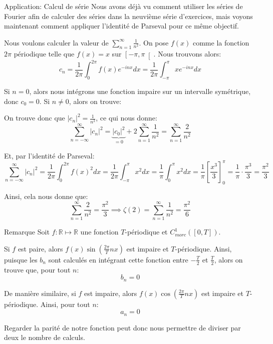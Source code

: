 \documentclass[a4paper]{article}
\begin{document}
\begin{parag}{Application: Calcul de série}
    Nous avons déjà vu comment utiliser les séries de Fourier afin de calculer des séries dans la neuvième série d'exercices, mais voyons maintenant comment appliquer l'identité de Parseval pour ce même objectif.

    Nous voulons calculer la valeur de $\sum_{n=1}^{\infty} \frac{1}{n^2}$. On pose $f\left(x\right)$ comme la fonction $2\pi$ périodique telle que $f\left(x\right) = x$ sur $\left[-\pi, \pi\right[ $. Nous trouvons alors: 
    \[c_n = \frac{1}{2\pi} \int_{0}^{2\pi} f\left(x\right) e^{-inx} dx = \frac{1}{2\pi} \int_{-\pi}^{\pi} xe^{-inx}dx\]
    
    Si $n = 0$, alors nous intégrons une fonction impaire sur un intervalle symétrique, donc $c_0 = 0$. Si $n \neq 0$, alors on trouve: 
    
    
    On trouve donc que $\left|c_n\right|^2 = \frac{1}{n^2}$, ce qui nous donne:
    \[\sum_{n=-\infty}^{\infty} \left|c_n\right|^2 = \underbrace{\left|c_0\right|^2}_{= 0} + 2\sum_{n=1}^{\infty} \frac{1}{n^2} = \sum_{n=1}^{\infty} \frac{2}{n^2}\]

    Et, par l'identité de Parseval: 
    \[\sum_{n=-\infty}^{\infty} \left|c_n\right|^2 = \frac{1}{2\pi} \int_{0}^{2\pi} f\left(x\right)^2 dx = \frac{1}{2\pi} \int_{-\pi}^{\pi} x^2 dx = \frac{1}{\pi} \int_{0}^{\pi} x^2 dx = \frac{1}{\pi} \left[\frac{x^3}{3}\right]^{\pi}_0 = \frac{1}{\pi} \cdot  \frac{\pi^3}{3} = \frac{\pi^2}{3}\]
    
    Ainsi, cela nous donne que: 
    \[\sum_{n=1}^{\infty} \frac{2}{n^2} = \frac{\pi^2}{3} \implies \zeta\left(2\right) = \sum_{n=1}^{\infty} \frac{1}{n^2} = \frac{\pi^2}{6}\]
\end{parag}

\begin{parag}{Remarque}
    Soit $f: \mathbb{R} \mapsto \mathbb{R}$ une fonction $T$-périodique et $C_{morc}^1\left(\left[0, T\right]\right)$. 

    Si $f$ est paire, alors $f\left(x\right)\sin\left(\frac{2\pi}{T} nx\right)$ est impaire et $T$-périodique. Ainsi, puisque les $b_n$ sont calculés en intégrant cette fonction entre $-\frac{T}{2}$ et $\frac{T}{2}$, alors on trouve que, pour tout $n$: 
    \[b_n = 0\]
    
    De manière similaire, si $f$ est impaire, alors $f\left(x\right) \cos\left(\frac{2\pi}{T} nx\right)$ est impaire et $T$-périodique. Ainsi, pour tout $n$: 
    \[a_n = 0\]

    Regarder la parité de notre fonction peut donc nous permettre de diviser par deux le nombre de calculs.
\end{parag}
\end{document}
